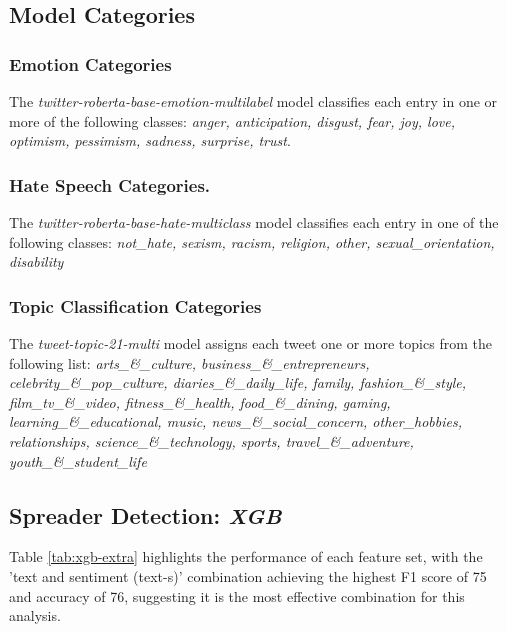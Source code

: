 \subsection{Model Categories}
\subsubsection{Emotion Categories}
\label{sec:emotion-list}
The \textit{twitter-roberta-base-emotion-multilabel} model classifies each entry in one or more of the following classes:
\textit{anger, anticipation, disgust, fear, joy, love, optimism, pessimism, sadness, surprise, trust}.

\subsubsection{Hate Speech Categories.}
\label{sec:hate-list}
The \textit{twitter-roberta-base-hate-multiclass}  model classifies each entry in one of the following classes: \textit{not\_hate, sexism, racism, religion, other, sexual\_orientation, disability}

\subsubsection{Topic Classification Categories}
\label{sec:topic-list}
The \textit{tweet-topic-21-multi} model assigns each tweet one or more topics from the following list: 
\textit{arts\_\&\_culture, business\_\&\_entrepreneurs, celebrity\_\&\_pop\_culture, diaries\_\&\_daily\_life, family, fashion\_\&\_style, film\_tv\_\&\_video, fitness\_\&\_health, food\_\&\_dining, gaming, learning\_\&\_educational, music, news\_\&\_social\_concern, other\_hobbies, relationships, science\_\&\_technology, sports, travel\_\&\_adventure, youth\_\&\_student\_life}


\subsection{Spreader Detection: \textit{XGB}}
\label{appendix:xgb}


Table \ref{tab:xgb-extra} highlights the performance of each feature set, with the 'text and sentiment (text-s)' combination achieving the highest F1 score of 75 and accuracy of 76, suggesting it is the most effective combination for this analysis.


